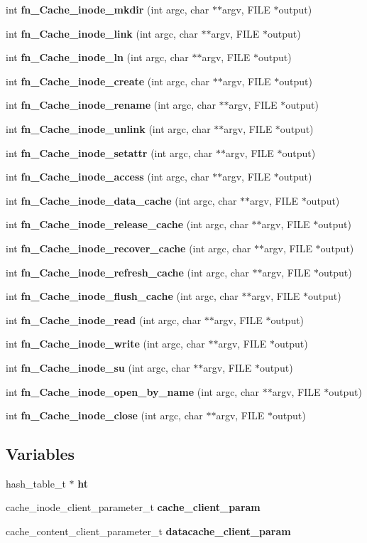 \begin{CompactItemize}
int {\bf fn\_\-Cache\_\-inode\_\-mkdir} (int argc, char $\ast$$\ast$argv, FILE $\ast$output)
\item 
int {\bf fn\_\-Cache\_\-inode\_\-link} (int argc, char $\ast$$\ast$argv, FILE $\ast$output)
\item 
int {\bf fn\_\-Cache\_\-inode\_\-ln} (int argc, char $\ast$$\ast$argv, FILE $\ast$output)
\item 
int {\bf fn\_\-Cache\_\-inode\_\-create} (int argc, char $\ast$$\ast$argv, FILE $\ast$output)
\item 
int {\bf fn\_\-Cache\_\-inode\_\-rename} (int argc, char $\ast$$\ast$argv, FILE $\ast$output)
\item 
int {\bf fn\_\-Cache\_\-inode\_\-unlink} (int argc, char $\ast$$\ast$argv, FILE $\ast$output)
\item 
int {\bf fn\_\-Cache\_\-inode\_\-setattr} (int argc, char $\ast$$\ast$argv, FILE $\ast$output)
\item 
int {\bf fn\_\-Cache\_\-inode\_\-access} (int argc, char $\ast$$\ast$argv, FILE $\ast$output)
\item 
int {\bf fn\_\-Cache\_\-inode\_\-data\_\-cache} (int argc, char $\ast$$\ast$argv, FILE $\ast$output)
\item 
int {\bf fn\_\-Cache\_\-inode\_\-release\_\-cache} (int argc, char $\ast$$\ast$argv, FILE $\ast$output)
\item 
int {\bf fn\_\-Cache\_\-inode\_\-recover\_\-cache} (int argc, char $\ast$$\ast$argv, FILE $\ast$output)
\item 
int {\bf fn\_\-Cache\_\-inode\_\-refresh\_\-cache} (int argc, char $\ast$$\ast$argv, FILE $\ast$output)
\item 
int {\bf fn\_\-Cache\_\-inode\_\-flush\_\-cache} (int argc, char $\ast$$\ast$argv, FILE $\ast$output)
\item 
int {\bf fn\_\-Cache\_\-inode\_\-read} (int argc, char $\ast$$\ast$argv, FILE $\ast$output)
\item 
int {\bf fn\_\-Cache\_\-inode\_\-write} (int argc, char $\ast$$\ast$argv, FILE $\ast$output)
\item 
int {\bf fn\_\-Cache\_\-inode\_\-su} (int argc, char $\ast$$\ast$argv, FILE $\ast$output)
\item 
int {\bf fn\_\-Cache\_\-inode\_\-open\_\-by\_\-name} (int argc, char $\ast$$\ast$argv, FILE $\ast$output)
\item 
int {\bf fn\_\-Cache\_\-inode\_\-close} (int argc, char $\ast$$\ast$argv, FILE $\ast$output)
\end{CompactItemize}
\subsection*{Variables}
\begin{CompactItemize}
\item 
hash\_\-table\_\-t $\ast$ {\bf ht}
\item 
cache\_\-inode\_\-client\_\-parameter\_\-t {\bf cache\_\-client\_\-param}
\item 
cache\_\-content\_\-client\_\-parameter\_\-t {\bf datacache\_\-client\_\-param}
\end{CompactItemize}


